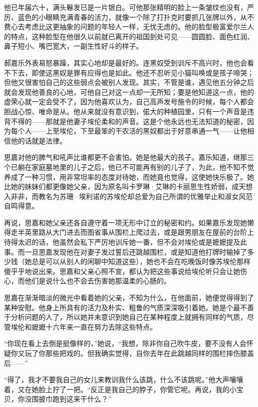 \par 他已年届六十，满头鬈发已是一片银白。可他那张精明的脸上一条皱纹也没有，严厉、蓝色的小眼睛充满青春的活力，就像一个除了打扑克时要抓几张牌以外，从不费心去考虑比这更抽象的问题的年轻人一样，无忧无虑的。他的脸型极富爱尔兰人的特点，这种脸型在他很久以前就已离开的祖国到处可见——圆圆脸、面色红润、鼻子短小、嘴巴宽大，一副生性好斗的样子。
\par 郝嘉乐外表易怒暴躁，其实心地却是最好的。连黑奴受到训斥不高兴时，他也会看不下去，即使这黑奴是罪有应得也是如此。他还不忍听见小猫叫唤或是孩子啼哭；但他又很害怕自己的这些弱点会被别人发现。其实，不管是谁，遇见他五分钟之后就会发现他善良的心地，可他自己对这一点却一无所知；要是他知道这一点，他的虚荣心就一定会受不了，因为他喜欢认为，自己高声发号施令的时候，每个人都会胆战心惊、唯命是从。他从来就没有意识到，偌大的种植园里，只有一个声音是违背不得的——那就是他妻子埃伦柔和的声音。这是个他永远也无法知道的秘密，因为每个人——上至埃伦，下至最笨的干农活的黑奴都出于好意串通一气——让他相信他的话就是法律。
\par 思嘉对他的脾气和吼声比谁都更不会害怕。她是他最大的孩子。嘉乐知道，继那三个已躺在家庭墓地里的儿子之后，他已不可能再有别的儿子了，为此，他不知不觉养成了一种习惯，用非常坦率的态度对待她，而她竟也觉得，这使她快乐极了。她比她的妹妹们都更像她父亲，因为原名叫卡罗琳·艾琳的卡丽恩生性娇弱，成天想入非非，而教名为苏珊·埃利诺的苏埃伦却总爱为自己所谓的优雅举止和淑女风范自鸣得意。
\par 再说，思嘉和她父亲还各自遵守着一项无形中订立的秘密和约。如果嘉乐发现她懒得走半英里路从大门进去而图省事从围栏上爬过去，或是跟男朋友在屋前的台阶上待得太迟的话，他虽然会私下严厉地训斥她一番，但不会对埃伦或是嬷嬷提及此事。而一旦思嘉发现他在对妻子发过誓后还跳越围栏，或是知道他打牌时输掉了多少钱（她总是可以从别人的闲聊中知道这些），她也不会在吃晚饭时像苏埃伦那样傻乎乎地说出来。思嘉和父亲心照不宣，都认为把这些事说给埃伦听只会让她伤心，而他们是说什么也不会去伤害她那温柔的心肠的。
\par 思嘉在渐渐暗淡的微光中看着她的父亲，不知为什么，在他面前，她便觉得得到了某种安慰。他身上所具有的活力及朴实、粗鲁的气质深深吸引着她。她是个最不善于分析问题的人了，所以她并未意识到她自己在某种程度上就拥有同样的气质，尽管埃伦和嬷嬷十六年来一直在努力去除这些特点。
\par “你现在看上去倒是挺像样的，”她说，“我想，除非你自己吹牛皮，要不没有人会怀疑你又玩了你那些把戏的。但我确实觉得，自你去年在此跳越同样的围栏摔伤膝盖后——”
\par “得了，我才不要我自己的女儿来教训我什么该跳，什么不该跳呢。”他大声嚷嚷着，又在她脸上拧了一把。“反正是我自己的脖子，你管它呢。再说，我的小宝贝，你没围披巾跑到这来干什么？”
